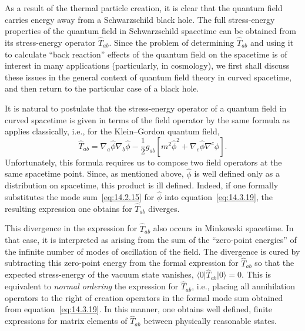 As a result of the thermal particle creation, it is clear that the quantum field carries
energy away from a Schwarzschild black hole. The full stress-energy properties of
the quantum field in Schwarzschild spacetime can be obtained from its stress-energy
operator \(\widehat T_{ab}\). Since the problem of determining \(\widehat T_{ab}\)
and using it to calculate ``back reaction'' effects of the quantum field on the spacetime
is of interest in many applications (particularly, in cosmology), we first shall discuss
these issues in the general context of quantum field theory in curved spacetime, and
then return to the particular case of a black hole.

It is natural to postulate that the stress-energy operator of a quantum field in curved
spacetime is given in terms of the field operator by the same formula as applies
classically, i.e., for the Klein--Gordon quantum field,
\begin{equation}
  \widehat T_{ab}
  =\nabla_a\widehat\phi\nabla_b\widehat\phi
  -\frac12g_{ab}\left[m^2\widehat\phi^2
    +\nabla_c\widehat\phi\nabla^c\widehat\phi\right].
  \tag{14.3.19}\label{eq:14.3.19}
\end{equation}
Unfortunately, this formula requires us to compose two field operators at the same
spacetime point. Since, as mentioned above, \(\widehat\phi\) is well defined only as
a distribution on spacetime, this product is ill defined. Indeed, if one formally
substitutes the mode sum~\eqref{eq:14.2.15} for \(\widehat\phi\) into
equation~\eqref{eq:14.3.19}, the resulting expression one obtains for
\(\widehat T_{ab}\) diverges.

This divergence in the expression for \(\widehat T_{ab}\) also occurs in Minkowski
spacetime. In that case, it is interpreted as arising from the sum of the ``zero-point
energies'' of the infinite number of modes of oscillation of the field. The divergence
is cured by subtracting this zero-point energy from the formal expression for
\(\widehat T_{ab}\) so that the expected stress-energy of the vacuum state vanishes,
\(\langle0\rvert\widehat T_{ab}\lvert0\rangle=0\). This is equivalent to
\emph{normal ordering} the expression for \(\widehat T_{ab}\), i.e., placing all
annihilation operators to the right of creation operators in the formal mode sum
obtained from equation~\eqref{eq:14.3.19}. In this manner, one obtains well defined,
finite expressions for matrix elements of \(\widehat T_{ab}\) between physically
reasonable states.

